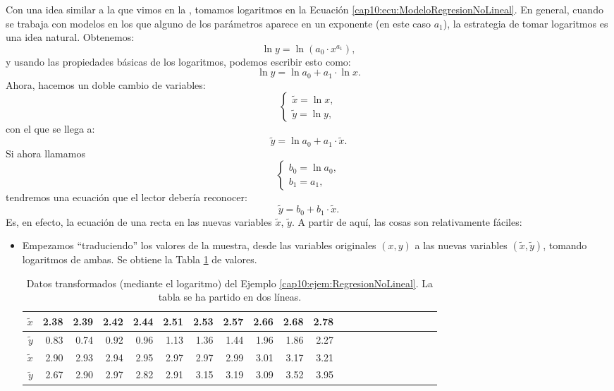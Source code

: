\begin{ejemplo}
Con una idea similar a la que vimos en la \pageref{cap10:subsubsec:ReflexionUsoRectaRegresion}, tomamos logaritmos en la Ecuación \ref{cap10:ecu:ModeloRegresionNoLineal}. En general, cuando se trabaja con modelos en los que alguno de los parámetros aparece en un exponente (en este caso $a_1$), la estrategia de tomar logaritmos es una idea natural. Obtenemos:
\[\ln y=\ln\left(a_0\cdot x^{a_1}\right),\]
y usando las propiedades básicas de los logaritmos, podemos escribir esto como:
\[\ln y=\ln a_0+a_1\cdot\ln x.\]
Ahora, hacemos un doble cambio de variables:
\begin{equation}
\label{cap10:ecu:RegresionNoLinealCambioVariables}
\begin{cases}
\tilde x=\ln x,\\
\tilde y=\ln y,
\end{cases}
\end{equation}
con el que se llega a:
\[\tilde y=\ln a_0+a_1\cdot\tilde x.\]
Si ahora llamamos
\[
\begin{cases}
b_0=\ln a_0,\\
b_1=a_1,
\end{cases}
\]
tendremos una ecuación que el lector debería reconocer:
\[\tilde y=b_0+b_1\cdot\tilde x.\]
Es, en efecto, la ecuación de una recta en las nuevas variables $\tilde x$, $\tilde y$. A partir de aquí, las cosas son relativamente fáciles:
\begin{itemize}
  \item Empezamos ``traduciendo'' los valores de la muestra, desde las variables originales $(x,y)$ a las nuevas variables $(\tilde x, \tilde y)$, tomando logaritmos de ambas. Se obtiene la Tabla \ref{cap10:tabla:EjemploRegresionNoLineal02} de valores.

    \begin{table}[ht]
        \centering
        \begin{tabular}{rrrrrrrrrrrrrrrrrrrrr}
        \hline
        \hline
              $\tilde x$ & 2.38 & 2.39 & 2.42 & 2.44 & 2.51 & 2.53 & 2.57 & 2.66 & 2.68 & 2.78 \\
        \hline
              $\tilde y$ & 0.83 & 0.74 & 0.92 & 0.96 & 1.13 & 1.36 & 1.44 & 1.96 & 1.86 & 2.27 \\
        \hline
        \hline
            $\tilde x$ & 2.90 & 2.93 & 2.94 & 2.95 & 2.97 & 2.97 & 2.99 & 3.01 & 3.17 & 3.21 \\
        \hline
            $\tilde y$ & 2.67 & 2.90 & 2.97 & 2.82 & 2.91 & 3.15 & 3.19 & 3.09 & 3.52 & 3.95\\
        \hline
        \hline
        \end{tabular}
        \caption{Datos transformados (mediante el logaritmo) del Ejemplo \ref{cap10:ejem:RegresionNoLineal}. La tabla se ha partido en dos líneas.}
        \label{cap10:tabla:EjemploRegresionNoLineal02}
    \end{table}


\end{itemize}
\end{ejemplo}
